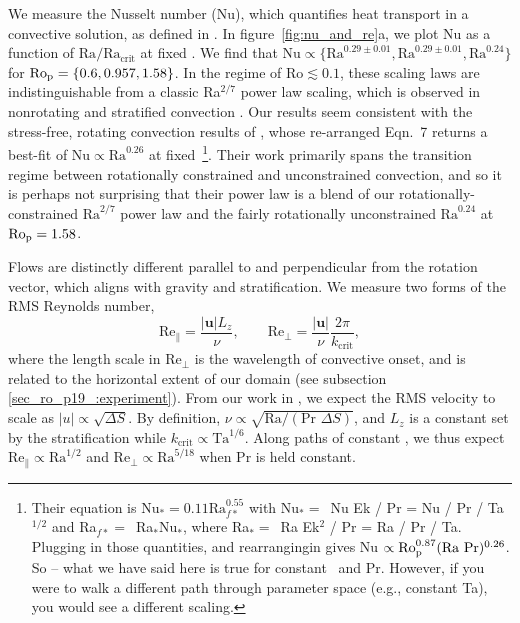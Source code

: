 We measure the Nusselt number (Nu), which quantifies heat transport in a convective
solution, as defined in \AB.
In figure~\ref{fig:nu_and_re}a, we plot Nu as a function
of $\text{Ra}/\text{Ra}_\text{crit}$ at fixed \pro. We find that $\text{Nu} \propto \{\text{Ra}^{0.29 \pm 0.01}, \text{Ra}^{0.29 \pm 0.01}, \text{Ra}^{0.24}\}$
for $\text{Ro}_{\text{p}} = \{0.6, 0.957, 1.58\}$. In the regime of $\text{Ro} \lesssim 0.1$, these scaling laws are indistinguishable
from a classic Ra$^{2/7}$ power law scaling,
which is observed in nonrotating \RB and stratified convection \citep[][\AB]{ahlers&all2009}.
Our results seem consistent with the stress-free, rotating \RB convection results of
\cite{schmitz&tilgner2009}, whose re-arranged Eqn.~7 returns a best-fit of $\text{Nu} \propto \text{Ra}^{0.26}$ at fixed \pro$\,$\footnote{
Their equation is Nu$_* = 0.11 \text{Ra}_{f*}^{0.55}$ with Nu$_* =\,$ Nu Ek / Pr = Nu / Pr / Ta$^{1/2}$ and Ra$_{f*} =\,$ Ra$_*$Nu$_*$, where Ra$_* =\,$ Ra Ek$^2$ / Pr = Ra / Pr / Ta.
Plugging in those quantities, and rearrangingin gives Nu $\propto \text{Ro}_{\text{p}} ^{0.87} (\text{Ra Pr})^{0.26}$.
So -- what we have said here is true for constant \pro$\,$ and Pr.
However, if you were to walk a different path through parameter space (e.g., constant Ta), you would see a different scaling.
}.
Their work primarily spans the transition
regime between rotationally constrained and unconstrained convection, and so it is perhaps not
surprising that their power law is a blend of our rotationally-constrained $\text{Ra}^{2/7}$ power
law and the fairly rotationally unconstrained $\text{Ra}^{0.24}$ at $\text{Ro}_{\text{p}} = 1.58$.

Flows are distinctly different parallel to and perpendicular
from the rotation vector, which aligns with gravity and stratification.
We measure two forms of the RMS Reynolds number,
\begin{equation}
\text{Re}_{\parallel} = \frac{|\bm{u}| L_z}{\nu}, \qquad
\text{Re}_{\perp}     = \frac{|\bm{u}|}{\nu}\frac{2\pi}{k_{\text{crit}}},
\label{eqn:ro_p19_re_defn}
\end{equation}
where the length scale in $\text{Re}_{\perp}$ is the wavelength of convective onset, and is
related to the horizontal extent of our domain (see subsection \ref{sec_ro_p19_:experiment}).
From our work in \AB, we expect the RMS velocity to scale as $|u| \propto \sqrt{\Delta S}$.
By definition, $\nu \propto \sqrt{\text{Ra}/(\text{Pr }\Delta S)}$, and $L_z$ is a constant
set by the stratification while $k_{\text{crit}} \propto \text{Ta}^{1/6}$. Along paths of
constant \pro, we thus expect $\text{Re}_{\parallel} \propto \text{Ra}^{1/2}$ and
$\text{Re}_{\perp} \propto \text{Ra}^{5/18}$ when $\text{Pr}$ is held constant.

